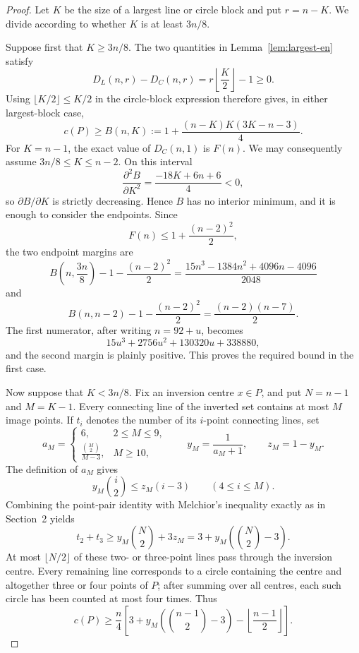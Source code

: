 \documentclass[11pt,a4paper]{article}
\theoremstyle{definition}
\begin{document}
\begin{proof}
Let $K$ be the size of a largest line or circle block and put $r=n-K$.
We divide according to whether $K$ is at least $3n/8$.

Suppose first that $K\ge3n/8$.  The two quantities in
Lemma~\ref{lem:largest-en} satisfy
\[
 D_L(n,r)-D_C(n,r)=r\left\lfloor\frac K2\right\rfloor-1\ge0.
\]
Using $\lfloor K/2\rfloor\le K/2$ in the circle-block expression therefore
gives, in either largest-block case,
\begin{equation}\label{eq:early-B-en}
 c(P)\ge B(n,K):=1+\frac{(n-K)K(3K-n-3)}4.
\end{equation}
For $K=n-1$, the exact value of $D_C(n,1)$ is $F(n)$.  We may consequently
assume $3n/8\le K\le n-2$.  On this interval
\[
 \frac{\partial^2 B}{\partial K^2}
 =\frac{-18K+6n+6}{4}<0,
\]
so $\partial B/\partial K$ is strictly decreasing.  Hence $B$ has no interior
minimum, and it is enough to consider the endpoints.  Since
\begin{equation}\label{eq:early-F-upper-en}
 F(n)\le 1+\frac{(n-2)^2}{2},
\end{equation}
the two endpoint margins are
\[
 B\left(n,\frac{3n}{8}\right)-1-\frac{(n-2)^2}{2}
 =\frac{15n^3-1384n^2+4096n-4096}{2048}
\]
and
\[
 B(n,n-2)-1-\frac{(n-2)^2}{2}
 =\frac{(n-2)(n-7)}2.
\]
The first numerator, after writing $n=92+u$, becomes
\[
 15u^3+2756u^2+130320u+338880,
\]
and the second margin is plainly positive.  This proves the required bound in
the first case.

Now suppose that $K<3n/8$.  Fix an inversion centre $x\in P$, and put
$N=n-1$ and $M=K-1$.  Every connecting line of the inverted set contains at
most $M$ image points.  If $t_i$ denotes the number of its $i$-point connecting
lines, set
\[
 a_M=
 \begin{cases}
 6,&2\le M\le9,\\[2pt]
 \displaystyle\frac{\binom M2}{M-3},&M\ge10,
 \end{cases}
 \qquad
 y_M=\frac1{a_M+1},\qquad z_M=1-y_M.
\]
The definition of $a_M$ gives
\[
 y_M\binom i2\le z_M(i-3)\qquad(4\le i\le M).
\]
Combining the point-pair identity with Melchior's inequality exactly as in
Section~2 yields
\begin{equation}\label{eq:early-dual-en}
 t_2+t_3\ge y_M\binom N2+3z_M
 =3+y_M\left(\binom N2-3\right).
\end{equation}
At most $\lfloor N/2\rfloor$ of these two- or three-point lines pass through
the inversion centre.  Every remaining line corresponds to a circle containing
the centre and altogether three or four points of $P$; after summing over all
centres, each such circle has been counted at most four times.  Thus
\begin{equation}\label{eq:early-inversion-en}
 c(P)\ge\frac n4\left[
 3+y_M\left(\binom{n-1}{2}-3\right)
 -\left\lfloor\frac{n-1}{2}\right\rfloor\right].
\end{equation}


\end{proof}
\end{document}
